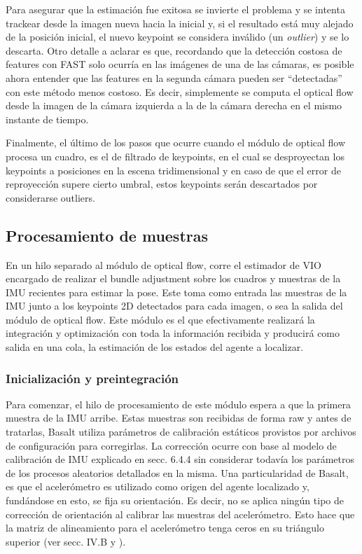 \documentclass[ twoside,openright,titlepage,numbers=noenddot,%
                headinclude,footinclude,cleardoublepage=empty,abstract=on,
                BCOR=-5mm,paper=a4,fontsize=11pt
                ]{scrreprt}
\begin{document}
Para asegurar que la estimación fue exitosa se invierte el problema y se
intenta trackear desde la imagen nueva hacia la inicial y, si el
resultado está muy alejado de la posición inicial, el nuevo keypoint se
considera inválido (un \emph{outlier}) y se lo descarta. Otro detalle a
aclarar es que, recordando que la detección costosa de features con FAST
solo ocurría en las imágenes de una de las cámaras, es posible ahora
entender que las features en la segunda cámara pueden ser ``detectadas''
con este método menos costoso. Es decir, simplemente se computa el
optical flow desde la imagen de la cámara izquierda a la de la cámara
derecha en el mismo instante de tiempo.

Finalmente, el último de los pasos que ocurre cuando el módulo de
optical flow procesa un cuadro, es el de filtrado de keypoints, en el
cual se desproyectan los keypoints a posiciones en la escena
tridimensional y en caso de que el error de reproyección supere cierto
umbral, estos keypoints serán descartados por considerarse outliers.

\hypertarget{procesamiento-de-muestras}{%
\subsection{Procesamiento de muestras}\label{procesamiento-de-muestras}}

En un hilo separado al módulo de optical flow, corre el estimador de VIO
encargado de realizar el bundle adjustment sobre los cuadros y muestras
de la IMU recientes para estimar la pose. Este toma como entrada las
muestras de la IMU junto a los keypoints 2D detectados para cada imagen,
o sea la salida del módulo de optical flow. Este módulo es el que
efectivamente realizará la integración y optimización con toda la
información recibida y producirá como salida en una cola, la estimación
de los estados del agente a localizar.

\hypertarget{basalt-preintegration}{%
\subsubsection{Inicialización y
preintegración}\label{basalt-preintegration}}

Para comenzar, el hilo de procesamiento de este módulo espera a que la
primera muestra de la IMU arribe. Estas muestras son recibidas de forma
raw y antes de tratarlas, Basalt utiliza parámetros de calibración
estáticos provistos por archivos de configuración para corregirlas. La
corrección ocurre con base al modelo de calibración de IMU explicado en
\textcite{barfootStateEstimationRobotics2017} secc. 6.4.4 sin considerar
todavía los parámetros de los procesos aleatorios detallados en la
misma. Una particularidad de Basalt, es que el acelerómetro es utilizado
como origen del agente localizado y, fundándose en esto, se fija su
orientación. Es decir, no se aplica ningún tipo de corrección de
orientación al calibrar las muestras del acelerómetro. Esto hace que la
matriz de alineamiento para el acelerómetro tenga ceros en su triángulo
superior (ver \textcite{schubertBasaltTUMVI2018} secc. IV.B y
).
\end{document}
